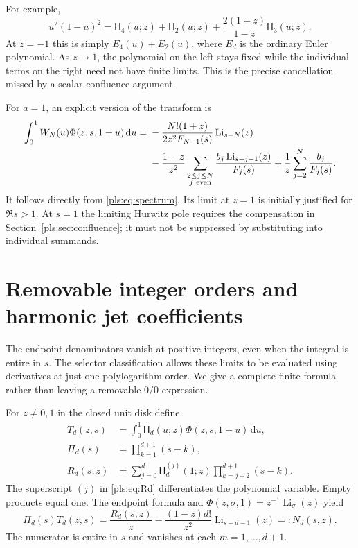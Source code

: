 \documentclass[11pt,letterpaper]{article}
\numberwithin{equation}{section}
\theoremstyle{definition}
\theoremstyle{remark}\newtheorem{remark}[theorem]{Remark}
\newcommand{\dd}{\,\mathrm d}
\newcommand{\Li}{\operatorname{Li}}
\newcommand{\HFE}{\mathsf H}
\begin{document}
For example,
\begin{equation}\label{pls:eq:quarticmix}
 u^2(1-u)^2=\HFE_4(u;z)+\HFE_2(u;z)
                   +\frac{2(1+z)}{1-z}\HFE_3(u;z).
\end{equation}
At $z=-1$ this is simply $E_4(u)+E_2(u)$, where $E_d$ is the
ordinary Euler polynomial. As $z\to1$, the polynomial on the left
stays fixed while the individual terms on the right need not have
finite limits. This is the precise cancellation missed by a scalar
confluence argument.

For $a=1$, an explicit version of the transform is
\begin{align}
 \int_0^1W_N(u)\Phi(z,s,1+u)\dd u
 ={}&-\frac{N!(1+z)}{2z^2F_{N-1}(s)}\Li_{s-N}(z)
       \notag\\
 &-\frac{1-z}{z^2}
       \sum_{\substack{2\le j\le N\\j\ {\rm even}}}
                      \frac{b_j\Li_{s-j-1}(z)}{F_j(s)}
   +\frac1z\sum_{j=2}^N\frac{b_j}{F_j(s)}.
\label{pls:eq:BernLi}
\end{align}
It follows directly from \eqref{pls:eq:spectrum}. Its limit at
$z=1$ is initially justified for $\Re s>1$. At $s=1$ the limiting
Hurwitz pole requires the compensation in
Section~\ref{pls:sec:confluence}; it must not be suppressed by
substituting into individual summands.

\section{Removable integer orders and harmonic jet coefficients}
\label{pls:sec:jets}

The endpoint denominators vanish at positive integers, even when the
integral is entire in $s$. The selector classification allows these
limits to be evaluated using derivatives at just one polylogarithm
order. We give a complete finite formula rather than leaving a
removable $0/0$ expression.

For $z\ne0,1$ in the closed unit disk define
\begin{align}
 T_d(z,s)&=\int_0^1\HFE_d(u;z)\Phi(z,s,1+u)\dd u,
                       \label{pls:eq:Td}\\
 \Pi_d(s)&=\prod_{k=1}^{d+1}(s-k),\label{pls:eq:Pid}\\
 R_d(s,z)&=\sum_{j=0}^d\HFE_d^{(j)}(1;z)
                           \prod_{k=j+2}^{d+1}(s-k).
                       \label{pls:eq:Rd}
\end{align}
The superscript $(j)$ in \eqref{pls:eq:Rd} differentiates the
polynomial variable. Empty products equal one. The endpoint formula
and $\Phi(z,\sigma,1)=z^{-1}\Li_\sigma(z)$ yield
\begin{equation}\label{pls:eq:numerator}
 \Pi_d(s)T_d(z,s)=\frac{R_d(s,z)}z
          -\frac{(1-z)d!}{z^2}\Li_{s-d-1}(z)
          =:N_d(s,z).
\end{equation}
The numerator is entire in $s$ and vanishes at each
$m=1,\ldots,d+1$.
\end{document}
